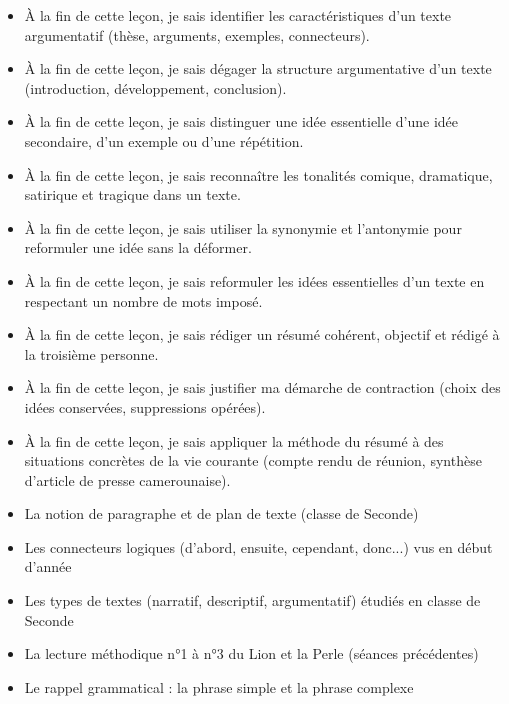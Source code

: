 \documentclass[11pt]{article}
\begin{document}
\begin{objectifs}
\begin{itemize}
\item À la fin de cette leçon, je sais identifier les caractéristiques d'un texte argumentatif (thèse, arguments, exemples, connecteurs).
\item À la fin de cette leçon, je sais dégager la structure argumentative d'un texte (introduction, développement, conclusion).
\item À la fin de cette leçon, je sais distinguer une idée essentielle d'une idée secondaire, d'un exemple ou d'une répétition.
\item À la fin de cette leçon, je sais reconnaître les tonalités comique, dramatique, satirique et tragique dans un texte.
\item À la fin de cette leçon, je sais utiliser la synonymie et l'antonymie pour reformuler une idée sans la déformer.
\item À la fin de cette leçon, je sais reformuler les idées essentielles d'un texte en respectant un nombre de mots imposé.
\item À la fin de cette leçon, je sais rédiger un résumé cohérent, objectif et rédigé à la troisième personne.
\item À la fin de cette leçon, je sais justifier ma démarche de contraction (choix des idées conservées, suppressions opérées).
\item À la fin de cette leçon, je sais appliquer la méthode du résumé à des situations concrètes de la vie courante (compte rendu de réunion, synthèse d'article de presse camerounaise).
\end{itemize}
\end{objectifs}

\begin{prerequis}
\begin{itemize}
\item La notion de paragraphe et de plan de texte (classe de Seconde)
\item Les connecteurs logiques (d'abord, ensuite, cependant, donc...) vus en début d'année
\item Les types de textes (narratif, descriptif, argumentatif) étudiés en classe de Seconde
\item La lecture méthodique n°1 à n°3 du Lion et la Perle (séances précédentes)
\item Le rappel grammatical : la phrase simple et la phrase complexe
\end{itemize}
\end{prerequis}
\end{document}
